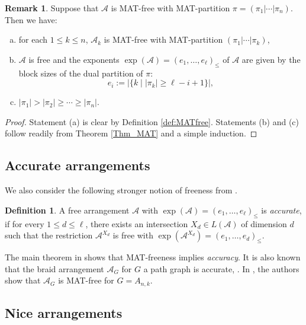 \documentclass[12pt]{amsart}
\newcommand\CA{{\mathscr A}}
\numberwithin{equation}{section}
\theoremstyle{plain}
\theoremstyle{definition}
\newtheorem{defn}[equation]{Definition}
\newtheorem{remark}[equation]{Remark}
\begin{document}
\begin{remark}
	\label{rem:MAT-free}
	Suppose that $\CA$ is MAT-free with MAT-partition
	$\pi = (\pi_1|\cdots|\pi_n)$. Then we have:
	\begin{enumerate}[(a)]
		\item 
		for each $1 \leq k \le n$, $\CA_k$ is MAT-free with MAT-partition $(\pi_1|\cdots|\pi_{k})$, 
		
		\item
		$\CA$ is free and the exponents 
		$\exp(\CA) = (e_1,\ldots,e_\ell)_\le$ of $\CA$ are given by the block sizes
		of the dual partition of $\pi$: 
		\[ 
		e_i := |\{k \mid |\pi_k|\geq \ell-i+1 \}|, 
		\]
		
		\item 
		$|\pi_1| > |\pi_2| \geq \cdots \geq |\pi_n|$.
	\end{enumerate}
\end{remark}
\begin{proof}
	Statement (a) is clear by Definition \ref{def:MATfree}.
	Statements (b) and (c) follow readily from Theorem \ref{Thm_MAT} and a simple induction.
\end{proof}



\subsection{Accurate arrangements}
\label{ssect:accuracy}

We also consider the following stronger notion of freeness from \cite{mueckschroehrle:accurate}.

\begin{defn}
\label{def:accurate}
 A free arrangement $\CA$ with $\exp(\CA)= (e_1,\ldots,e_\ell)_\le$ is \emph{accurate}, if for every $1\leq d \leq \ell$, there exists an intersection $X_d\in L(\CA)$ of dimension $d$ such that the restriction $\CA^{X_d}$ is free with $\exp(\CA^{X_d}) =  (e_1,\ldots,e_d)_\le$. 
\end{defn}

The main theorem in \cite[Thm.~1.2]{mueckschroehrle:accurate}
shows that MAT-freeness implies \emph{accuracy}.
It is also known that the braid arrangement $\CA_G$ for $G$ a path graph is accurate, \cite[Thm.~1.6]{mueckschroehrle:accurate}.
In \cite[Thm.~4.1]{cuntzkuehne:subgraphs}, the authors show that $\CA_G$ is MAT-free for $G = A_{n,k}$.


\subsection{Nice arrangements}
\label{ssect:factored}
\end{document}
